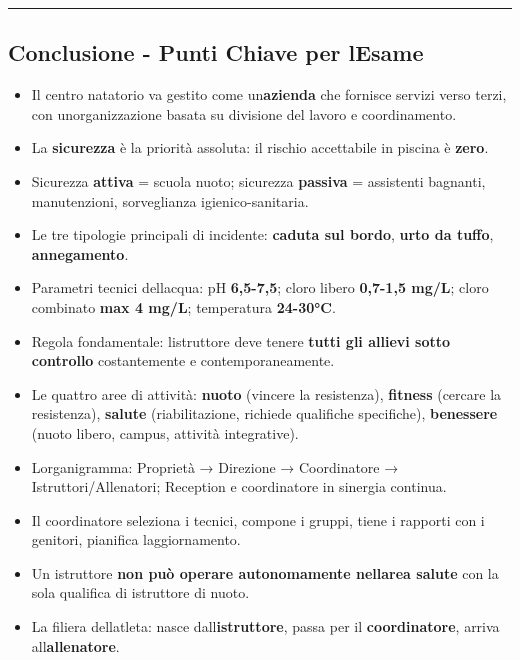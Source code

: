 \documentclass[a4paper,11pt]{article}
\providecommand{\tightlist}{%
  \setlength{\itemsep}{0pt}\setlength{\parskip}{0pt}}
\begin{document}
\begin{center}\rule{0.5\linewidth}{0.5pt}\end{center}

\subsection{Conclusione - Punti Chiave per
      l\textquotesingle Esame}\label{conclusione---punti-chiave-per-lesame-12}

\begin{itemize}
      \tightlist
      \item
            Il centro natatorio va gestito come
            un\textquotesingle{}\textbf{azienda} che fornisce servizi verso terzi,
            con un\textquotesingle organizzazione basata su divisione del lavoro e
            coordinamento.
      \item
            La \textbf{sicurezza} è la priorità assoluta: il rischio accettabile
            in piscina è \textbf{zero}.
      \item
            Sicurezza \textbf{attiva} = scuola nuoto; sicurezza \textbf{passiva} =
            assistenti bagnanti, manutenzioni, sorveglianza igienico-sanitaria.
      \item
            Le tre tipologie principali di incidente: \textbf{caduta sul bordo},
            \textbf{urto da tuffo}, \textbf{annegamento}.
      \item
            Parametri tecnici dell\textquotesingle acqua: pH \textbf{6,5-7,5};
            cloro libero \textbf{0,7-1,5 mg/L}; cloro combinato \textbf{max 4
                  mg/L}; temperatura \textbf{24-30°C}.
      \item
            Regola fondamentale: l\textquotesingle istruttore deve tenere
            \textbf{tutti gli allievi sotto controllo} costantemente e
            contemporaneamente.
      \item
            Le quattro aree di attività: \textbf{nuoto} (vincere la resistenza),
            \textbf{fitness} (cercare la resistenza), \textbf{salute}
            (riabilitazione, richiede qualifiche specifiche), \textbf{benessere}
            (nuoto libero, campus, attività integrative).
      \item
            L\textquotesingle organigramma: Proprietà → Direzione → Coordinatore →
            Istruttori/Allenatori; Reception e coordinatore in sinergia continua.
      \item
            Il coordinatore seleziona i tecnici, compone i gruppi, tiene i
            rapporti con i genitori, pianifica l\textquotesingle aggiornamento.
      \item
            Un istruttore \textbf{non può operare autonomamente
                  nell\textquotesingle area salute} con la sola qualifica di istruttore
            di nuoto.
      \item
            La filiera dell\textquotesingle atleta: nasce
            dall\textquotesingle{}\textbf{istruttore}, passa per il
            \textbf{coordinatore}, arriva
            all\textquotesingle{}\textbf{allenatore}.
\end{itemize}
\end{document}
